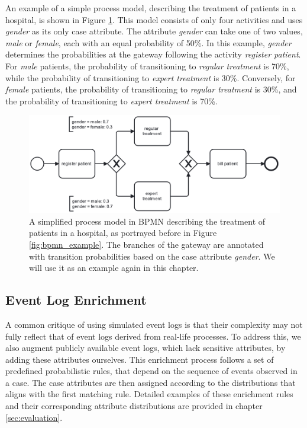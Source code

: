 An example of a simple process model, describing the treatment of patients in a hospital, is shown in Figure \ref{fig:showcase}.
This model consists of only four activities and uses \textit{gender} as its only case attribute.
The attribute \textit{gender} can take one of two values, \textit{male} or \textit{female}, each with an equal probability of 50\%.
In this example, \textit{gender} determines the probabilities at the gateway following the activity \textit{register patient}.
For \textit{male} patients, the probability of transitioning to \textit{regular treatment} is 70\%,
while the probability of transitioning to \textit{expert treatment} is 30\%.
Conversely, for \textit{female} patients, the probability of transitioning to \textit{regular treatment} is 30\%,
and the probability of transitioning to \textit{expert treatment} is 70\%.

\begin{figure}[h!]
    \centering
    \includegraphics[width=\textwidth]{gfx/showcase.png}
    \caption{A simplified process model in BPMN describing the treatment of patients in a hospital, as portrayed before in Figure \ref{fig:bpmn_example}.
    The branches of the gateway are annotated with transition probabilities based on the case attribute \textit{gender}.
    We will use it as an example again in this chapter.}
    \label{fig:showcase}
\end{figure}


\subsection{Event Log Enrichment}
A common critique of using simulated event logs
is that their complexity may not fully reflect that of event logs derived from real-life processes.
To address this, we also augment publicly available event logs, which lack sensitive attributes,
by adding these attributes ourselves.
This enrichment process follows a set of predefined probabilistic rules,
that depend on the sequence of events observed in a case.
The case attributes are then assigned according to the distributions that aligns with the first matching rule.
Detailed examples of these enrichment rules
and their corresponding attribute distributions are provided in chapter \ref{sec:evaluation}.

